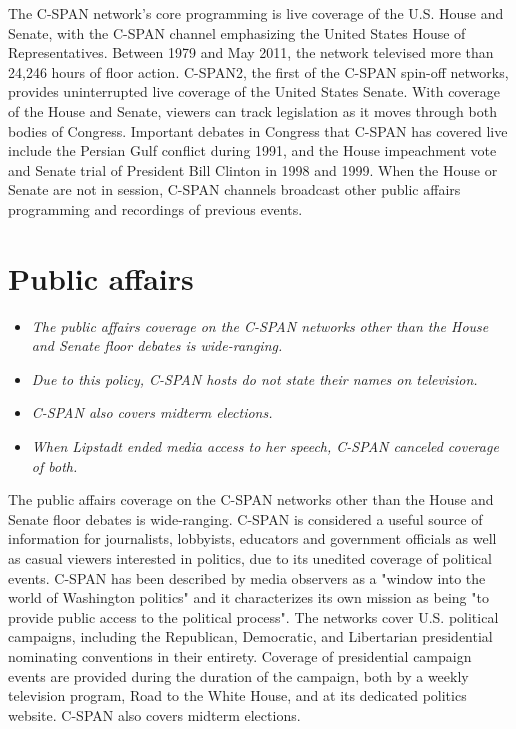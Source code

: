 The C-SPAN network's core programming is live coverage of the U.S. House
and Senate, with the C-SPAN channel emphasizing the United States House
of Representatives. Between 1979 and May 2011, the network televised
more than 24,246 hours of floor action. C-SPAN2, the first of the C-SPAN
spin-off networks, provides uninterrupted live coverage of the United
States Senate. With coverage of the House and Senate, viewers can track
legislation as it moves through both bodies of Congress. Important
debates in Congress that C-SPAN has covered live include the Persian
Gulf conflict during 1991, and the House impeachment vote and Senate
trial of President Bill Clinton in 1998 and 1999. When the House or
Senate are not in session, C-SPAN channels broadcast other public
affairs programming and recordings of previous events.

\section{Public affairs}\label{public-affairs}

\begin{itemize}
\item
  \emph{The public affairs coverage on the C-SPAN networks other than
  the House and Senate floor debates is wide-ranging.}
\item
  \emph{Due to this policy, C-SPAN hosts do not state their names on
  television.}
\item
  \emph{C-SPAN also covers midterm elections.}
\item
  \emph{When Lipstadt ended media access to her speech, C-SPAN canceled
  coverage of both.}
\end{itemize}

The public affairs coverage on the C-SPAN networks other than the House
and Senate floor debates is wide-ranging. C-SPAN is considered a useful
source of information for journalists, lobbyists, educators and
government officials as well as casual viewers interested in politics,
due to its unedited coverage of political events. C-SPAN has been
described by media observers as a "window into the world of Washington
politics" and it characterizes its own mission as being "to provide
public access to the political process". The networks cover U.S.
political campaigns, including the Republican, Democratic, and
Libertarian presidential nominating conventions in their entirety.
Coverage of presidential campaign events are provided during the
duration of the campaign, both by a weekly television program, Road to
the White House, and at its dedicated politics website. C-SPAN also
covers midterm elections.


